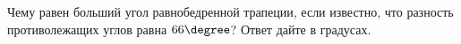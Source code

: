 \begin{ex}
	\begin{condition}
		 Чему равен больший угол равнобедренной трапеции, если известно, что разность противолежащих углов равна \( 66\degree \)? Ответ дайте в градусах.
	\end{condition}
\end{ex}